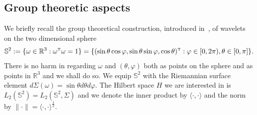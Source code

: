 \documentclass[a4paper,11pt,DIV=11,%
abstract=on%
]{scrartcl}
\def\tT{{\mbox{\tiny{T}}}}
\def\R{{\mathbb R}}
\newcommand{\red}[1]{#1}
\begin{document}
\subsection{Group theoretic aspects} \label{ssec:rep-sphere}
 \red{We briefly recall the group theoretical
construction, introduced in~\cite{AV99}, of wavelets on the two dimensional sphere
$$
\mathbb S^2 := \{ \omega\in\R^3 : \omega^\tT\omega=1 \} =\{(\sin \theta
\cos \varphi,\sin \theta \sin\varphi, 
\cos \theta)^\tT: \varphi \in [0,2\pi), \theta \in [0,\pi]\}.  
$$
There is no harm in  regarding $\omega$ and $(\theta,\varphi)$ both as points on the sphere and as points
in $\mathbb R^3$ and we shall do so.  We equip $\mathbb S^2$ with the Riemannian
surface element  $d\Sigma(\omega) = \sin \theta d \theta d \varphi$.
The Hilbert space $H$  we are interested in is $L_2(\mathbb S^2) =
L_2(\mathbb S^2,\Sigma)$ and we denote the  inner product by
$\langle\cdot,\cdot\rangle$ and the norm by 
$\|\cdot\| = \langle \cdot, \cdot\rangle^\frac12$. 

}
\end{document}
